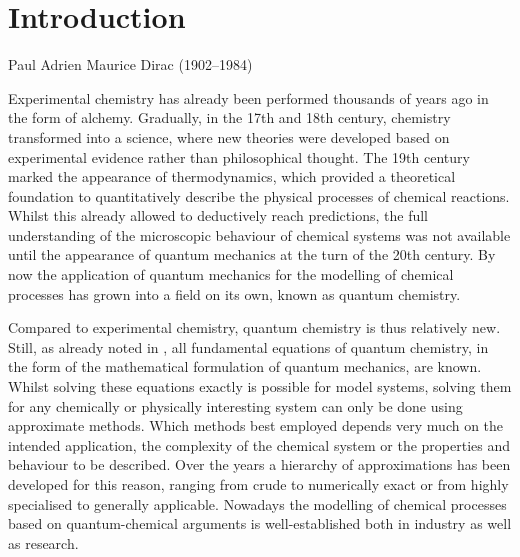 \chapter{Introduction}
{Paul Adrien Maurice Dirac (1902--1984)}

\noindent
Experimental chemistry
has already been performed thousands of years ago
in the form of alchemy.
Gradually,
in the 17th and 18th century,
chemistry transformed into a science,
where new theories were developed based on
experimental evidence rather than philosophical thought.
The 19th century marked the appearance of thermodynamics,
which provided a theoretical foundation
to quantitatively describe the physical processes of chemical reactions.
Whilst this already allowed to deductively reach predictions,
the full understanding of the microscopic behaviour
of chemical systems was not available until the appearance
of quantum mechanics at the turn of the 20th century.
By now the application of quantum mechanics for the modelling of chemical processes
has grown into a field on its own, known as quantum chemistry.

Compared to experimental chemistry, quantum chemistry is thus relatively new.
Still, as \citet{Dirac1929} already noted in \citeyear{Dirac1929},
all fundamental equations of quantum chemistry,
in the form of the mathematical formulation of quantum mechanics, are known.
Whilst solving these equations exactly is possible for model systems,
solving them for any chemically or physically
interesting system can only be done using approximate methods.
Which methods best employed depends very much on the intended application,
\ie the complexity of the chemical system
or the properties and behaviour to be described.
Over the years a hierarchy of approximations has been developed for this reason,
ranging from crude to numerically exact
or from highly specialised to generally applicable.
Nowadays the modelling of chemical processes
based on quantum-chemical arguments
is well-established both in industry as well as research.

